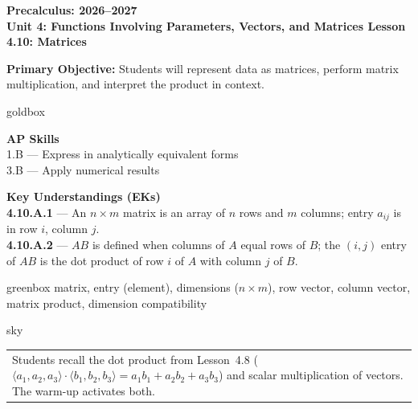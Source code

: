 \documentclass[10pt]{article}
\newcommand{\CourseName}{Precalculus}
\newcommand{\SchoolYear}{2026--2027}
\newcommand{\UnitNumberName}{Unit 4: Functions Involving Parameters, Vectors, and Matrices \quad}
\newcommand{\LessonNumberName}{Lesson 4.10: Matrices}
\begin{document}
\begin{center}
    {\Large\bfseries \CourseName: \SchoolYear \\[4pt]
    {\small\bfseries \UnitNumberName \LessonNumberName}}
\end{center}

\begin{tcolorbox}[colback=sky, colframe=navy, boxrule=0.9pt, arc=2mm,
    left=2mm, right=2mm, top=1.5mm, bottom=1.5mm]
    \textbf{Primary Objective:} Students will represent data as matrices,
    perform matrix multiplication, and interpret the product in context.
\end{tcolorbox}

\renewcommand{\arraystretch}{1.6}
\begin{skillbox}{goldbox}
    \begin{minipage}[t]{0.46\linewidth}\vspace{0pt}
        \textbf{AP Skills}\\
        1.B --- Express in analytically equivalent forms\\
        3.B --- Apply numerical results
    \end{minipage}
    \hfill
    \begin{minipage}[t]{0.50\linewidth}\vspace{0pt}
        \textbf{Key Understandings (EKs)}\\
        \textbf{4.10.A.1} --- An $n \times m$ matrix is an array of $n$ rows and $m$ columns; entry $a_{ij}$ is in row $i$, column $j$.\\[2pt]
        \textbf{4.10.A.2} --- $AB$ is defined when columns of $A$ equal rows of $B$; the $(i,j)$ entry of $AB$ is the dot product of row $i$ of $A$ with column $j$ of $B$.
    \end{minipage}
\end{skillbox}

\begin{skillbox}{greenbox}
    matrix, entry (element), dimensions ($n \times m$), row vector, column vector, matrix product, dimension compatibility
\end{skillbox}

\begin{skillbox}{sky}
    \begin{tabularx}{\linewidth}{@{}X@{}}
        Students recall the dot product from Lesson~4.8 ($\langle a_1, a_2, a_3\rangle \cdot \langle b_1, b_2, b_3\rangle = a_1 b_1 + a_2 b_2 + a_3 b_3$) and scalar multiplication of vectors. The warm-up activates both.
    \end{tabularx}
\end{skillbox}
\end{document}
